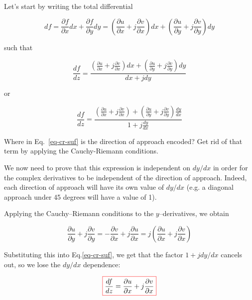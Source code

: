 Let's start by writing the total differential

\begin{equation}
d f = \frac{\partial f}{\partial x} d x + \frac{\partial f}{\partial y} d y  = \left( \frac{\partial u}{\partial x}+j\frac{\partial v}{\partial x}\right) d x+\left(\frac{\partial u}{\partial y}+j\frac{\partial v}{\partial y}\right) d y
\end{equation} 

such that

\begin{equation}
\frac{d f}{d z} = \frac{\left(\frac{\partial u}{\partial x}+j\frac{\partial v}{\partial x}\right) d x+\left(\frac{\partial u}{\partial y}+j\frac{\partial v}{\partial y}\right) d y}{d x + j d y}
\end{equation} 

or

\begin{equation}
\frac{d f}{d z} = \frac{\left(\frac{\partial u}{\partial x}+j\frac{\partial v}{\partial x}\right) +\left(\frac{\partial u}{\partial y}+j\frac{\partial v}{\partial y}\right) \frac{d y}{d x}}{1 + j \frac{d y}{d x}} \label{eq-cr-suf}
\end{equation} 

\begin{cue}
Where in Eq.~\ref{eq-cr-suf} is the direction of approach encoded? Get rid of that term by applying the Cauchy-Riemann conditions.
\end{cue}

We now need to prove that this expression is independent on $d y / d x$ in order for the complex derivatives to be independent of the direction of approach. Indeed, each direction of approach will have its own value of $d y / d x$ (e.g. a diagonal approach under 45 degrees will have a value of 1).

Applying the Cauchy--Riemann conditions to the $y$--derivatives, we obtain

\begin{equation}
\frac{\partial u}{\partial y}+j\frac{\partial v}{\partial y} = -\frac{\partial v}{\partial x}+j\frac{\partial u}{\partial x} = j \left( \frac{\partial u}{\partial x}+j\frac{\partial v}{\partial x} \right)
\end{equation}

Substituting this into Eq.\ref{eq-cr-suf}, we get that the factor $1 + j d y / d x$ cancels out, so we lose the  $d y / d x$ dependence:

\begin{equation}
\fbox{$\displaystyle
\frac{d f}{d z} = \frac{\partial u}{\partial x}+j\frac{\partial v}{\partial x}
$}
\end{equation} 

